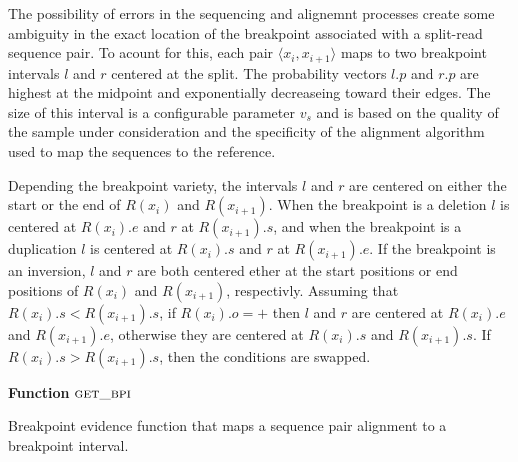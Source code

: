 \documentclass[11pt]{article}
\begin{document}
The possibility of errors in the sequencing and alignemnt processes create some
ambiguity in the exact location of the breakpoint associated with a split-read
sequence pair.  To acount for this, each pair $\langle x_i, x_{i+1} \rangle$
maps to two breakpoint intervals $l$ and $r$ centered at the split. The 
probability vectors $l.p$ and $r.p$ are highest at the midpoint and
exponentially decreaseing toward their edges.  The size of this interval is a
configurable parameter $v_s$ and is based on the quality of the sample under
consideration and the specificity of the alignment algorithm used to map the
sequences to the reference.

Depending the breakpoint variety, the intervals $l$ and $r$ are centered on
either the start or the end of $R(x_i)$ and $R(x_{i+1})$.  When the breakpoint
is a deletion $l$ is centered at $R(x_i).e$ and $r$ at $R(x_{i+1}).s$, and when
the breakpoint is a duplication $l$ is centered at $R(x_i).s$ and $r$ at
$R(x_{i+1}).e$.  If the breakpoint is an inversion, $l$ and $r$ are both 
centered ether at the start positions or end positions of $R(x_i)$ and
$R(x_{i+1})$, respectivly.  Assuming that $R(x_i).s<R(x_{i+1}).s$, if
$R(x_i).o=+$ then $l$ and $r$ are centered at $R(x_i).e$ and  $R(x_{i+1}).e$,
otherwise they are centered at $R(x_i).s$ and  $R(x_{i+1}).s$.  If
$R(x_i).s>R(x_{i+1}).s$, then the conditions are swapped.


\begin{algorithm}[H]
    \DontPrintSemicolon
    \footnotesize
    \BlankLine
    \textbf{Function} $\textsc{get\_bpi}$\;
	\caption{Breakpoint evidence function that maps a sequence pair alignment to
			a breakpoint interval.}
    \label{get_bp_sr}
\end{algorithm}
\end{document}
